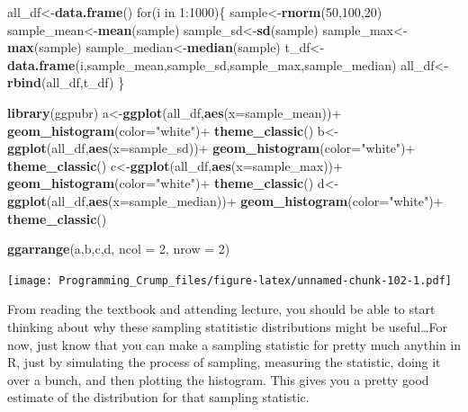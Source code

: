 \documentclass[]{book}
\newenvironment{Shaded}{\begin{snugshade}}{\end{snugshade}}
\newcommand{\KeywordTok}[1]{\textcolor[rgb]{0.13,0.29,0.53}{\textbf{{#1}}}}
\newcommand{\DataTypeTok}[1]{\textcolor[rgb]{0.13,0.29,0.53}{{#1}}}
\newcommand{\DecValTok}[1]{\textcolor[rgb]{0.00,0.00,0.81}{{#1}}}
\newcommand{\StringTok}[1]{\textcolor[rgb]{0.31,0.60,0.02}{{#1}}}
\newcommand{\NormalTok}[1]{{#1}}
\theoremstyle{definition}
\theoremstyle{definition}
\theoremstyle{definition}
\theoremstyle{remark}
\begin{document}
\begin{Shaded}
\begin{Highlighting}[]
\NormalTok{all_df<-}\KeywordTok{data.frame}\NormalTok{()}
\NormalTok{for(i in }\DecValTok{1}\NormalTok{:}\DecValTok{1000}\NormalTok{)\{}
  \NormalTok{sample<-}\KeywordTok{rnorm}\NormalTok{(}\DecValTok{50}\NormalTok{,}\DecValTok{100}\NormalTok{,}\DecValTok{20}\NormalTok{)}
  \NormalTok{sample_mean<-}\KeywordTok{mean}\NormalTok{(sample)}
  \NormalTok{sample_sd<-}\KeywordTok{sd}\NormalTok{(sample)}
  \NormalTok{sample_max<-}\KeywordTok{max}\NormalTok{(sample)}
  \NormalTok{sample_median<-}\KeywordTok{median}\NormalTok{(sample)}
  \NormalTok{t_df<-}\KeywordTok{data.frame}\NormalTok{(i,sample_mean,sample_sd,sample_max,sample_median)}
  \NormalTok{all_df<-}\KeywordTok{rbind}\NormalTok{(all_df,t_df)}
\NormalTok{\}}

\KeywordTok{library}\NormalTok{(ggpubr)}
\NormalTok{a<-}\KeywordTok{ggplot}\NormalTok{(all_df,}\KeywordTok{aes}\NormalTok{(}\DataTypeTok{x=}\NormalTok{sample_mean))+}
\StringTok{  }\KeywordTok{geom_histogram}\NormalTok{(}\DataTypeTok{color=}\StringTok{"white"}\NormalTok{)+}
\StringTok{  }\KeywordTok{theme_classic}\NormalTok{()}
\NormalTok{b<-}\KeywordTok{ggplot}\NormalTok{(all_df,}\KeywordTok{aes}\NormalTok{(}\DataTypeTok{x=}\NormalTok{sample_sd))+}
\StringTok{  }\KeywordTok{geom_histogram}\NormalTok{(}\DataTypeTok{color=}\StringTok{"white"}\NormalTok{)+}
\StringTok{  }\KeywordTok{theme_classic}\NormalTok{()}
\NormalTok{c<-}\KeywordTok{ggplot}\NormalTok{(all_df,}\KeywordTok{aes}\NormalTok{(}\DataTypeTok{x=}\NormalTok{sample_max))+}
\StringTok{  }\KeywordTok{geom_histogram}\NormalTok{(}\DataTypeTok{color=}\StringTok{"white"}\NormalTok{)+}
\StringTok{  }\KeywordTok{theme_classic}\NormalTok{()}
\NormalTok{d<-}\KeywordTok{ggplot}\NormalTok{(all_df,}\KeywordTok{aes}\NormalTok{(}\DataTypeTok{x=}\NormalTok{sample_median))+}
\StringTok{  }\KeywordTok{geom_histogram}\NormalTok{(}\DataTypeTok{color=}\StringTok{"white"}\NormalTok{)+}
\StringTok{  }\KeywordTok{theme_classic}\NormalTok{()}

\KeywordTok{ggarrange}\NormalTok{(a,b,c,d,}
          \DataTypeTok{ncol =} \DecValTok{2}\NormalTok{, }\DataTypeTok{nrow =} \DecValTok{2}\NormalTok{)}
\end{Highlighting}
\end{Shaded}

\texttt{[image: Programming\_Crump\_files/figure-latex/unnamed-chunk-102-1.pdf]}

From reading the textbook and attending lecture, you should be able to
start thinking about why these sampling statitistic distributions might
be useful\ldots{}For now, just know that you can make a sampling
statistic for pretty much anythin in R, just by simulating the process
of sampling, measuring the statistic, doing it over a bunch, and then
plotting the histogram. This gives you a pretty good estimate of the
distribution for that sampling statistic.
\end{document}
